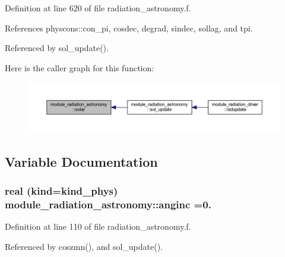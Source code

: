 Definition at line 620 of file radiation\+\_\+astronomy.\+f.



References physcons\+::con\+\_\+pi, cosdec, degrad, sindec, sollag, and tpi.



Referenced by sol\+\_\+update().



Here is the caller graph for this function\+:
\nopagebreak
\begin{figure}[H]
\begin{center}
\leavevmode
\includegraphics[width=350pt]{namespacemodule__radiation__astronomy_a3c99615d1cda89bcdb5ea1af3bca9d6f_icgraph}
\end{center}
\end{figure}




\subsection{Variable Documentation}
\subsubsection[{\texorpdfstring{anginc}{anginc}}]{\setlength{\rightskip}{0pt plus 5cm}real (kind=kind\+\_\+phys) module\+\_\+radiation\+\_\+astronomy\+::anginc =0.\hspace{0.3cm}{\ttfamily [private]}}\hypertarget{namespacemodule__radiation__astronomy_a723159a44491e4ae974128123a1e8dcd}{}\label{namespacemodule__radiation__astronomy_a723159a44491e4ae974128123a1e8dcd}


Definition at line 110 of file radiation\+\_\+astronomy.\+f.



Referenced by coszmn(), and sol\+\_\+update().

